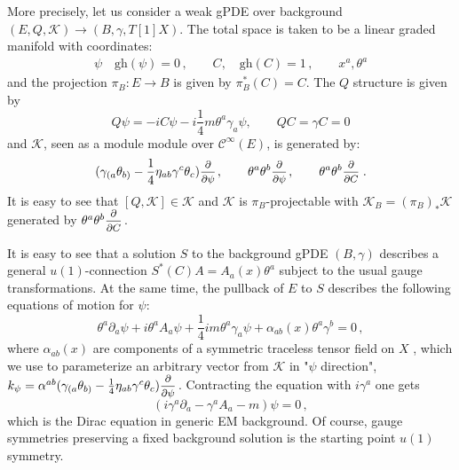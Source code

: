 \documentclass[a4paper,12pt]{article}
\numberwithin{equation}{section} %
\newcommand{\gh}[1]{\mathrm{gh}(#1)}
\renewcommand{\d}{\partial}
\newcommand{\ffrac}[2]{\raisebox{.5pt}%
  {\footnotesize$\displaystyle\frac{#1}{#2}$}\kern1pt}
\newcommand{\ddl}[2]{\ffrac{\d #1}{\d #2}}
\newcommand{\cC}{\mathcal{C}}
\def\cK{\mathcal{K}}
\begin{document}
More precisely, let us consider a weak gPDE over background $(E,Q,\cK)\rightarrow (B,\gamma, T[1]X)$. The total space is taken to be a linear graded manifold with coordinates: 
\begin{equation}
\begin{gathered}
    \psi \quad \gh{\psi} = 0\,, \qquad 
    C, \quad \gh{C} = 1 \,,\qquad  x^a, \theta^a
\end{gathered}
\end{equation}
and the projection $\pi_B:E \to B$ is given by $\pi_B^* (C)=C$.  The $Q$ structure is given by 
\begin{equation}
    Q\psi = -iC\psi - i\frac{1}{4} m\theta^a \gamma_a \psi, \qquad QC = \gamma C = 0
\end{equation}
and $\cK$, seen as a module module over $\cC^\infty(E)$, is generated by:
\begin{equation}
\begin{gathered}
    (\gamma_{(a}\theta_{b)} - \frac{1}{4} \eta_{ab}\gamma^c \theta_c)\ddl{}{\psi}, \qquad  \theta^a \theta^b \ddl{}{\psi}, \qquad   
    \theta^a \theta^b \ddl{}{C} \,.
\end{gathered}
\end{equation}
It is easy to see that $[Q,\cK] \in \cK$ and $\cK$ is $\pi_B$-projectable with $\cK_B=(\pi_B)_*\cK$ generated by $\theta^a \theta^b \ddl{}{C}$.

It is easy to see that a solution $S$ to the background gPDE $(B,\gamma)$ describes a general $u(1)$-connection $S^*(C)A=A_a(x)\theta^a$ subject to the usual gauge transformations. At the same time, the pullback of $E$ to $S$ describes the following equations of motion for $\psi$: 
\begin{equation}
    \theta^a\partial_a\psi + i \theta^a A_a \psi + \frac{1}{4}im\theta^a \gamma_a \psi+ \alpha_{ab}(x)\theta^a\gamma^b = 0\,,
\end{equation}
where $\alpha_{ab}(x)$ are components of a symmetric traceless tensor field on $X$ , which we use to parameterize an arbitrary vector from $\cK$ in "$\psi$ direction", $k_\psi = \alpha^{ab}(\gamma_{(a}\theta_{b)} - \frac{1}{4} \eta_{ab}\gamma^c \theta_c)\ddl{}{\psi}$. Contracting the equation with $i\gamma^a$ one gets
\begin{equation}
   ( i\gamma^a \partial_a - \gamma^a A_a - m)\psi = 0\,,
\end{equation}
which is the Dirac equation in generic EM background. Of course, gauge symmetries preserving a fixed background solution is the starting point $u(1)$ symmetry.
\end{document}
